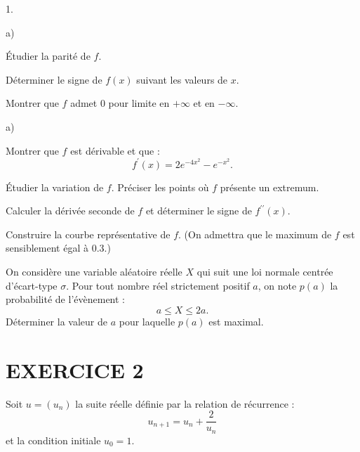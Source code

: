 \documentclass[11pt]{article}%
\begin{document}
\begin{noliste}{1.}
 \setlength{\itemsep}{4mm}
\item 

\begin{noliste}{a)}
 \setlength{\itemsep}{2mm}
\item Étudier la parité de $f$.

\item Déterminer le signe de $f(x)$ suivant les valeurs de $x$.

\item Montrer que $f$ admet $0$ pour limite en $ + \infty $ et en
$-\infty $.
\end{noliste}

\item 

\begin{noliste}{a)}
 \setlength{\itemsep}{2mm}
\item Montrer que $f$ est dérivable et que : 
\[
f^{\prime }(x) = 2e^{-4x^{2}}-e^{-x^{2}}.
\]

\item Étudier la variation de $f$. Préciser les points où $f$ présente
un
extremum.

\item Calculer la dérivée seconde de $f$ et déterminer le signe de
$f^{\prime \prime }(x)$.

\item Construire la courbe représentative de $f$. (On admettra que le
maximum de $f$ est sensiblement égal à $0{.}3$.)
\end{noliste}

\item On considère une variable aléatoire réelle $X$ qui suit une loi
normale centrée d'écart-type $\sigma $. Pour tout nombre réel
strictement
positif $a$, on note $p(a)$ la probabilité de l'évènement : 
\[
a\leq X\leq 2a.
\]
Déterminer la valeur de $a$ pour laquelle $p(a)$ est maximal.
\end{noliste}

\section*{EXERCICE 2}

Soit $u = \left(u_{n}\right)$ la suite réelle définie par la relation
de
récurrence : 
\[
u_{n + 1} = u_{n} + \frac{2}{u_{n}}
\]
et la condition initiale $u_{0} = 1$.
\end{document}
